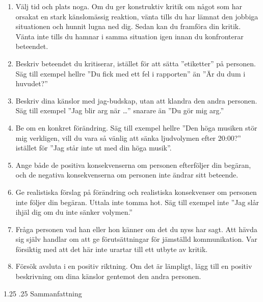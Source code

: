 \documentclass[swedish,a4paper]{book}
\makeatletter
\renewcommand\section{\@startsection{section}{1}{\z@}%
                                   {1.25\baselineskip}%
                                   {.25\baselineskip}%
                                   {\fontsize{1.25\baselineskip}{1.25\baselineskip}\selectfont\sffamily\bfseries}} %
\makeatother
\begin{document}
\begin{enumerate}

\item Välj tid och plats noga. Om du ger konstruktiv kritik om något som har orsakat en stark känslomässig reaktion, vänta tills du har lämnat den jobbiga situationen och hunnit lugna ned dig. Sedan kan du framföra din kritik. Vänta inte tills du hamnar i samma situation igen innan du konfronterar beteendet.

\item Beskriv beteendet du kritiserar, istället för att sätta ''etiketter'' på personen. Säg till exempel hellre ''Du fick med ett fel i rapporten'' än ''Är du dum i huvudet?''

\item Beskriv dina känslor med jag-budskap, utan att klandra den andra personen.  Säg till exempel ''Jag blir arg när \ldots{}'' snarare än ''Du gör mig arg.''

\item Be om en konkret förändring. Säg till exempel hellre ''Den höga musiken stör mig verkligen, vill du vara så vänlig att sänka ljudvolymen efter 20:00?'' istället för ''Jag står inte ut med din höga musik''.

\item Ange både de positiva konsekvenserna om personen efterföljer din begäran, och de negativa konsekvenserna om personen inte ändrar sitt beteende.

\item Ge realistiska förslag på förändring och realistiska konsekvenser om personen inte följer din begäran. Uttala inte tomma hot. Säg till exempel inte ''Jag slår ihjäl dig om du inte sänker volymen.''

\item Fråga personen vad han eller hon känner om det du nyss har sagt. Att hävda sig själv handlar om att ge förutsättningar för jämställd kommunikation. Var försiktig med att det här inte urartar till ett utbyte av kritik.

\item Försök avsluta i en positiv riktning. Om det är lämpligt, lägg till en positiv beskrivning om dina känslor gentemot den andra personen.

\end{enumerate}

\section{Sammanfattning}
\end{document}
